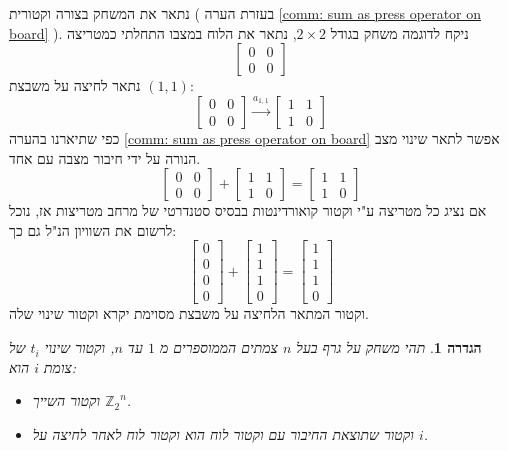 \documentclass[12pt,leqno]{article}
\theoremstyle{theoremdd}
\newtheorem{definition}{הגדרה}[section]
\newcommand{\Zn}{{\mathbb{Z}_2}^n}
\begin{document}
נתאר את המשחק 
בצורה וקטורית
(
בעזרת הערה 
\ref{comm: sum as press operator on board}
).
ניקח לדוגמה
משחק בגודל
$2 \times 2$,
נתאר את הלוח במצבו התחלתי כמטריצה
\[\begin{bmatrix}
0 & 0 \\
0 & 0 
\end{bmatrix}\]
נתאר לחיצה על משבצת 
$(1,1)$:
\[ 
    \begin{bmatrix}
    0 & 0 \\
    0 & 0 
    \end{bmatrix} \stackrel{a_{1,1}}{\longrightarrow}
    \begin{bmatrix}
    1 & 1 \\
    1 & 0 
    \end{bmatrix}
 \]
 כפי שתיארנו 
 בהערה 
 \ref{comm: sum as press operator on board}
 אפשר לתאר שינוי מצב הנורה על ידי חיבור 
 מצבה
 עם אחד.
\[
    \begin{bmatrix}
    0 & 0 \\
    0 & 0 
    \end{bmatrix} + 
    \begin{bmatrix}
    1 & 1 \\
    1 & 0 
    \end{bmatrix}=
    \begin{bmatrix}
    1 & 1 \\
    1 & 0 
    \end{bmatrix} 
\]  
אם נציג כל מטריצה ע"י וקטור קואורדינטות
בבסיס סטנדרטי של מרחב מטריצות
אז, נוכל לרשום את השוויון הנ"ל גם כך:
 \[ 
    \begin{bmatrix} 
    0 \\ 0 \\ 0 \\ 0
    \end{bmatrix} +  \begin{bmatrix} 
    1 \\ 1 \\ 1 \\ 0
    \end{bmatrix} =  \begin{bmatrix} 
    1 \\ 1 \\ 1 \\ 0
    \end{bmatrix}  
 \]
וקטור המתאר הלחיצה
על משבצת מסוימת יקרא וקטור שינוי שלה.
 \begin{definition}
    \label{def:chang-vector}
    תהי 
    משחק על גרף בעל
    $n$
    צמתים
    הממוספרים מ
    $1$
    עד
    $n$,
    וקטור שינוי
    $t_i$
    של צומת  
    $i$
    הוא:
    \begin{itemize}
        \item 
            וקטור 
            השייך 
            $\Zn$.
        \item 
            וקטור שתוצאת החיבור עם וקטור לוח 
            הוא וקטור לוח לאחר לחיצה על 
            $i$.
    \end{itemize}
\end{definition}
\end{document}

